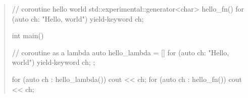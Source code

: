 \begin{quote}
\pnum
\enterexample
\begin{codeblock}
  
// coroutine hello world
std::experimental::generator<char> hello_fn() {
  for (auto ch: "Hello, world") yield-keyword ch;
}
  
int main() {
  // coroutine as a lambda
  auto hello_lambda = []{ for (auto ch: "Hello, world") yield-keyword ch; };
  
  for (auto ch : hello_lambda()) 
     cout << ch;
  for (auto ch : hello_fn()) 
     cout << ch;
}
\end{codeblock}
\exitexample



%

\end{quote}